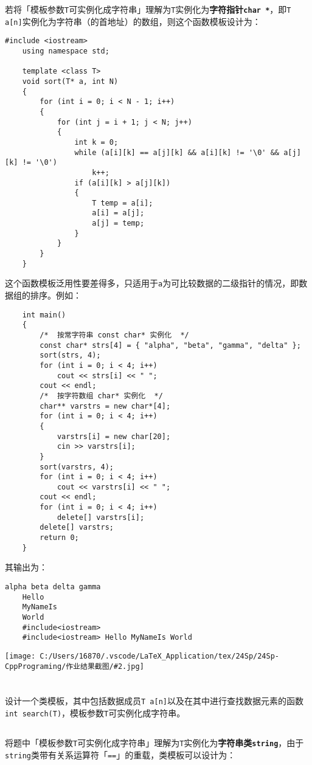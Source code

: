 \documentclass[10pt, a4paper, oneside, fontset=none]{ctexart}
\theoremstyle{plain}
\theoremstyle{definition}
\newcommand{\prtsc}[2][14]{\begin{center}
	\texttt{[image: C:/Users/16870/.vscode/LaTeX\_Application/tex/24Sp/24Sp-CppPrograming/作业结果截图/\#2.jpg]}
	\vspace{-1em}
\end{center}}
\begin{document}
若将「模板参数\texttt{T}可实例化成字符串」理解为\texttt{T}实例化为\textbf{字符指针\texttt{char *}}，即\texttt{T a[n]}实例化为字符串（的首地址）的数组，则这个函数模板设计为：
\begin{lstlisting}[style=answer]
	#include <iostream>
	using namespace std;
	
	template <class T>
	void sort(T* a, int N)
	{
		for (int i = 0; i < N - 1; i++)
		{
			for (int j = i + 1; j < N; j++)
			{
				int k = 0;
				while (a[i][k] == a[j][k] && a[i][k] != '\0' && a[j][k] != '\0')
					k++;
				if (a[i][k] > a[j][k])
				{
					T temp = a[i];
					a[i] = a[j];
					a[j] = temp;
				}
			}
		}
	}	
\end{lstlisting}
这个函数模板泛用性要差得多，只适用于\texttt{a}为可比较数据的二级指针的情况，即数据组的排序。例如：
\begin{lstlisting}
	int main()
	{
		/*  按常字符串 const char* 实例化  */
		const char* strs[4] = { "alpha", "beta", "gamma", "delta" };
		sort(strs, 4);
		for (int i = 0; i < 4; i++)
			cout << strs[i] << " ";
		cout << endl;
		/*  按字符数组 char* 实例化  */
		char** varstrs = new char*[4];
		for (int i = 0; i < 4; i++)
		{
			varstrs[i] = new char[20];
			cin >> varstrs[i];
		}
		sort(varstrs, 4);
		for (int i = 0; i < 4; i++)
			cout << varstrs[i] << " ";
		cout << endl;
		for (int i = 0; i < 4; i++)
			delete[] varstrs[i];
		delete[] varstrs;
		return 0;
	}	
\end{lstlisting}
其输出为：
\begin{lstlisting}[style=output]
	alpha beta delta gamma
	Hello
	MyNameIs
	World
	#include<iostream>
	#include<iostream> Hello MyNameIs World
\end{lstlisting}
\prtsc{12-01-2}

\newpage
\section{}
\normalfont

设计一个类模板，其中包括数据成员\texttt{T a[n]}以及在其中进行查找数据元素的函数\texttt{int search(T)}，模板参数\texttt{T}可实例化成字符串。

\subsection{}
\kai

将题中「模板参数\texttt{T}可实例化成字符串」理解为\texttt{T}实例化为\textbf{字符串类\texttt{string}}，由于\texttt{string}类带有关系运算符「\texttt{==}」的重载，类模板可以设计为：
\end{document}
